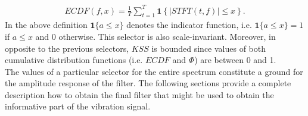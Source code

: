 \documentclass[11pt]{article} %
\begin{document}
\begin{eqnarray}\label{ECDF}
ECDF(f,x)=\frac{1}{T}\sum_{t=1}^{T}\mathbf{1}\left\{ |STFT(t,f)|\leq x\right\}.
\end{eqnarray}
In the above definition $\mathbf{1}\{a\leq x\}$ denotes the indicator function, i.e. $\mathbf{1}\{a\leq x\}=1$ if $a\leq x$ and 0 otherwise. This selector is also scale-invariant. Moreover, in opposite to the previous selectors, $KSS$ is bounded since values of both cumulative distribution functions (i.e. $ECDF$ and $\Phi$) are between 0 and 1.\\
The values of a particular selector for the entire spectrum constitute a ground for the amplitude response of the filter. The following sections provide a complete description how to obtain the final filter that might be used to obtain the informative part of the vibration signal.
\end{document}
